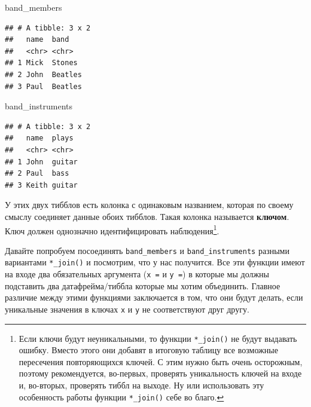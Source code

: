 \documentclass[]{book}
\newenvironment{Shaded}{\begin{snugshade}}{\end{snugshade}}
\newcommand{\NormalTok}[1]{#1}
\begin{document}
\begin{Shaded}
\begin{Highlighting}[]
\NormalTok{band_members}
\end{Highlighting}
\end{Shaded}

\begin{verbatim}
## # A tibble: 3 x 2
##   name  band   
##   <chr> <chr>  
## 1 Mick  Stones 
## 2 John  Beatles
## 3 Paul  Beatles
\end{verbatim}

\begin{Shaded}
\begin{Highlighting}[]
\NormalTok{band_instruments}
\end{Highlighting}
\end{Shaded}

\begin{verbatim}
## # A tibble: 3 x 2
##   name  plays 
##   <chr> <chr> 
## 1 John  guitar
## 2 Paul  bass  
## 3 Keith guitar
\end{verbatim}

У этих двух тибблов есть колонка с одинаковым названием, которая по
своему смыслу соединяет данные обоих тибблов. Такая колонка называется
\textbf{ключом}. Ключ должен однозначно идентифицировать
наблюдения\footnote{Если ключи будут неуникальными, то функции
  \texttt{*\_join()} не будут выдавать ошибку. Вместо этого они добавят
  в итоговую таблицу все возможные пересечения повторяющихся ключей. С
  этим нужно быть очень осторожным, поэтому рекомендуется, во-первых,
  проверять уникальность ключей на входе и, во-вторых, проверять тиббл
  на выходе. Ну или использовать эту особенность работы функции
  \texttt{*\_join()} себе во благо.}.

Давайте попробуем посоединять \texttt{band\_members} и
\texttt{band\_instruments} разными вариантами \texttt{*\_join()} и
посмотрим, что у нас получится. Все эти функции имеют на входе два
обязательных аргумента (\texttt{x\ =} и \texttt{y\ =}) в которые мы
должны подставить два датафрейма/тиббла которые мы хотим объединить.
Главное различие между этими функциями заключается в том, что они будут
делать, если уникальные значения в ключах \texttt{x} и \texttt{y} не
соответствуют друг другу.
\end{document}
